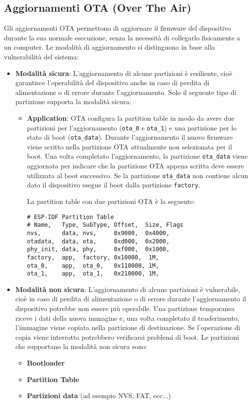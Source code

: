 \documentclass[a4paper]{article}
\begin{document}
\subsection{Aggiornamenti OTA (Over The Air)}
Gli aggiornamenti OTA permettono di aggiornare il firmware del dispositivo durante la
sua normale esecuzione, senza la necessità di collegarlo fisicamente a un computer. Le
modalità di aggiornamento si distinguono in base alla vulnerabilità del sistema:
\begin{itemize}
  \item \textbf{Modalità sicura}: L'aggiornamento di alcune partizioni è resiliente,
    cioè garantisce l'operabilità del dispositivo anche in caso di perdita di alimentazione
    o di errore durante l'aggiornamento. Solo il seguente tipo di partizione supporta
    la modalità sicura:
    \begin{itemize}
      \item \textbf{Application}: OTA configura la partition table in modo da avere
        due partizioni per l'aggiornamento (\texttt{ota\_0} e \texttt{ota\_1}) e una
        partizione per lo stato di boot (\texttt{ota\_data}). Durante l'aggiornamento il
        nuovo firmware viene scritto nella partizione OTA attualmente non selezionata
        per il boot. Una volta completato l'aggiornamento, la partizione \texttt{ota\_data}
        viene aggiornata per indicare che la partizione OTA appena scritta deve essere
        utilizzata al boot successivo. Se la partizione \texttt{ota\_data} non contiene
        alcun dato il dispositivo esegue il boot dalla partizione \texttt{factory}.

        La partition table con due partizioni OTA è la seguente:
        \begin{lstlisting}
# ESP-IDF Partition Table
# Name,   Type, SubType, Offset,  Size, Flags
nvs,      data, nvs,     0x9000,  0x4000,
otadata,  data, ota,     0xd000,  0x2000,
phy_init, data, phy,     0xf000,  0x1000,
factory,  app,  factory, 0x10000,  1M,
ota_0,    app,  ota_0,   0x110000, 1M,
ota_1,    app,  ota_1,   0x210000, 1M,
        \end{lstlisting}
    \end{itemize}
  \item \textbf{Modalità non sicura}: L'aggiornamento di alcune partizioni è vulnerabile,
    cioè in caso di perdita di alimentazione o di errore durante l'aggiornamento il
    dispositivo potrebbe non essere più operabile. Una partizione temporanea riceve
    i dati della nuova immagine e, una volta completato il trasferimento, l'immagine viene
    copiata nella partizione di destinazione. Se l'operazione di copia viene interrotta
    potrebbero verificarsi problemi di boot. Le partizioni che supportano la modalità non
    sicura sono:
    \begin{itemize}
      \item \textbf{Bootloader}
      \item \textbf{Partition Table}
      \item \textbf{Partizioni data} (ad esempio NVS, FAT, ecc...)
    \end{itemize}
\end{itemize}
\end{document}
